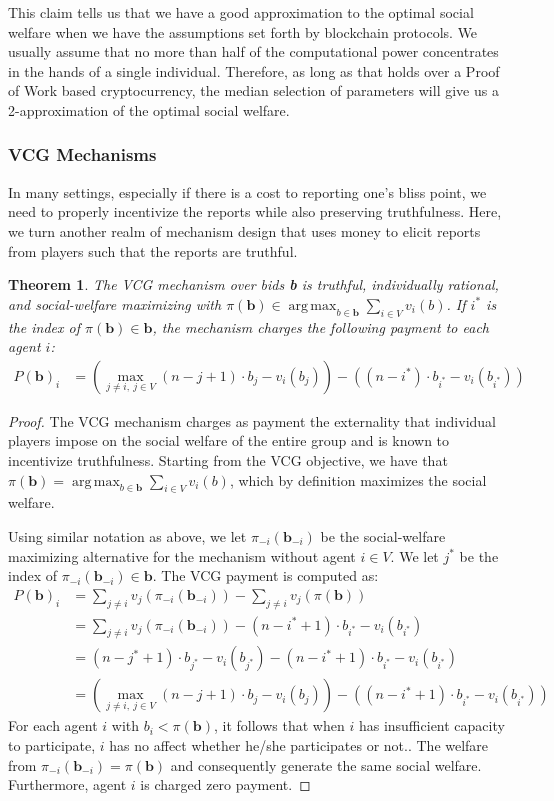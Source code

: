 \documentclass{article}
\DeclareMathOperator*{\argmax}{arg\,max}
\newtheorem{theorem}{Theorem}[section]
\theoremstyle{definition}
\theoremstyle{definition}
\newcounter{protocol}
\begin{document}
This claim tells us that we have a good approximation to the optimal social welfare when we have the assumptions set forth by blockchain protocols. We usually assume that no more than half of the computational power concentrates in the hands of a single individual. Therefore, as long as that holds over a Proof of Work based cryptocurrency, the median selection of parameters will give us a 2-approximation of the optimal social welfare.

\subsubsection{VCG Mechanisms}
In many settings, especially if there is a cost to reporting one's bliss point, we need to properly incentivize the reports while also preserving truthfulness. Here, we turn another realm of mechanism design that uses money to elicit reports from players such that the reports are truthful.
\begin{theorem}
The VCG mechanism over bids \textbf{b} is truthful, individually rational, and social-welfare maximizing with $\pi(\textbf{b})\in \argmax_{b\in \textbf{b}} \sum_{i\in V} v_i(b)$. If $i^*$ is the index of $\pi(\textbf{b})\in \textbf{b}$, the mechanism charges the following payment to each agent $i$:
\begin{align*}
    P(\textbf{b})_i &= (\max_{j\neq i,~j\in V} (n-j+1)\cdot b_j - v_i(b_j)) - ((n-i^*)\cdot b_{i^*} - v_i(b_{i^*}))
\end{align*}
\end{theorem}
\begin{proof}
The VCG mechanism charges as payment the externality that individual players impose on the social welfare of the entire group and is known to incentivize truthfulness. Starting from the VCG objective, we have that $\pi(\textbf{b}) = \argmax_{b\in \textbf{b}}\sum_{i\in V} v_i(b)$, which by definition maximizes the social welfare. 

Using similar notation as above, we let $\pi_{-i}(\textbf{b}_{-i})$ be the social-welfare maximizing alternative for the mechanism without agent $i\in V$. We let $j^*$ be the index of $\pi_{-i}(\textbf{b}_{-i})\in \textbf{b}$. The VCG payment is computed as:
\begin{align*}
    P(\textbf{b})_i &= \sum_{j\neq i}v_j(\pi_{-i}(\textbf{b}_{-i})) - \sum_{j\neq i}v_j(\pi(\textbf{b})) \\
    &= \sum_{j\neq i} v_j(\pi_{-i}(\textbf{b}_{-i})) - (n-i^* + 1)\cdot b_{i^*} - v_i(b_{i^*}) \\
    &= (n-j^* + 1)\cdot b_{j^*} - v_i(b_{j^*}) - (n-i^* + 1)\cdot b_{i^*} - v_i(b_{i^*}) \\ 
    &= (\max_{j\neq i,~j\in V} (n-j+1)\cdot b_j - v_i(b_{j})) - ((n-i^*+1)\cdot b_{i^*} - v_i(b_{i^*}))
\end{align*}
For each agent $i$ with $b_i < \pi(\textbf{b})$, it follows that when $i$ has insufficient capacity to participate, $i$ has no affect whether he/she participates or not.. The welfare from $\pi_{-i}(\textbf{b}_{-i}) = \pi(\textbf{b})$ and consequently generate the same social welfare. Furthermore, agent $i$ is charged zero payment.
\end{proof}
\end{document}
